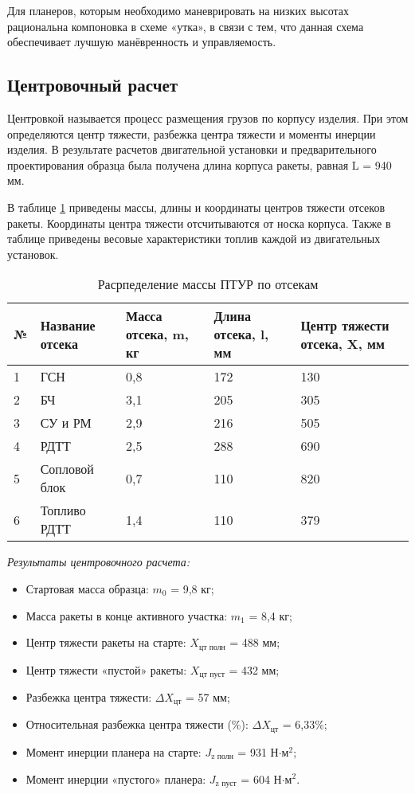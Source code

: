 Для планеров, которым необходимо маневрировать на низких высотах рациональна компоновка в схеме «утка», в связи с тем, что данная схема обеспечивает лучшую манёвренность и управляемость.

\subsection{Центровочный расчет}
Центровкой называется процесс размещения грузов по корпусу изделия. При этом определяются центр тяжести, разбежка центра тяжести и моменты инерции изделия. В результате расчетов двигательной установки и предварительного проектирования образца была получена длина корпуса ракеты, равная L = 940 мм.

В таблице \ref{tab:center} приведены массы, длины и координаты центров тяжести отсеков ракеты. Координаты центра тяжести отсчитываются от носка корпуса. Также в таблице приведены весовые характеристики топлив каждой из двигательных установок.

\begin{table}[!h]
	\begin{center}
		\caption{Расрпеделение массы ПТУР по отсекам}
		\begin{tabular}{|l|p{25mm}|p{3cm}|p{35mm}|p{35mm}|}
  		\hline
№ &	Название отсека	& Масса отсека, m, кг & Длина отсека, l, мм & Центр тяжести отсека, X, мм \\ \hline
1 &	ГСН	& 0,8	& 172	& 130 \\ \hline
2 &	БЧ	& 3,1	& 205	& 305 \\ \hline
3 &	СУ и РМ	& 2,9	& 216 &	505 \\ \hline
4 &	РДТТ	& 2,5	& 288 &	690 \\  \hline
5 &	Сопловой блок	& 0,7	& 110 & 	820 \\ \hline
6 &	Топливо РДТТ	& 1,4 &	110	& 379 \\ \hline
		\end{tabular}
		\label{tab:center}
	\end{center}
\end{table}

\clearpage
\emph{Результаты центровочного расчета:}
\begin{itemize}
	\item Стартовая масса образца:					$m_0$ = 9,8 кг;
	\item Масса ракеты в конце активного участка:	$m_1$ = 8,4 кг;
	\item Центр тяжести ракеты на старте:			$X_{\text{цт полн}}$ = 488 мм;
	\item Центр тяжести «пустой» ракеты:			$X_{\text{цт пуст}}$ = 432 мм;
	\item Разбежка центра тяжести:					$\Delta X_\text{цт}$ = 57 мм;
	\item Относительная разбежка центра тяжести (\%):	$\Delta X_\text{цт}$ = 6,33\%;
	\item Момент инерции планера на старте:			$J_\text{z полн}$ = 931 Н$\cdot \text{м}^2$;
	\item Момент инерции «пустого» планера:			$J_\text{z пуст}$ = 604 Н$\cdot \text{м}^2$.
\end{itemize}


